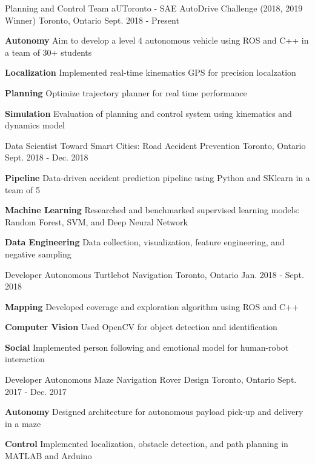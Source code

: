 \begin{cventries}
	\cventry
	{Planning and Control Team}
	{aUToronto - SAE AutoDrive Challenge (2018, 2019 Winner)}
	{Toronto, Ontario}
	{Sept. 2018 - Present}
	{
		\begin{cvitems}
			\item {\textbf{Autonomy} Aim to develop a level 4 autonomous vehicle using ROS and C++ in a team of 30+ students}
			\item {\textbf{Localization} Implemented real-time kinematics GPS for precision localzation
			}
			\item {\textbf{Planning} Optimize trajectory planner for real time performance		
			}
			\item {\textbf{Simulation} Evaluation of planning and control system using kinematics and dynamics model
			}
		\end{cvitems}
	}	
	\cventry
	{Data Scientist}
	{Toward Smart Cities: Road Accident Prevention}
	{Toronto, Ontario}
	{Sept. 2018 - Dec. 2018}
	{
		\begin{cvitems}
			\item {\textbf{Pipeline} Data-driven accident prediction pipeline using Python and SKlearn in a team of 5}
			\item {\textbf{Machine Learning} Researched and benchmarked supervised learning models: Random Forest, SVM, and Deep Neural Network}
			\item {\textbf{Data Engineering} Data collection, visualization, feature engineering, and negative sampling }
		\end{cvitems}
	}
	\cventry
	{Developer}
	{Autonomous Turtlebot Navigation}
	{Toronto, Ontario}
	{Jan. 2018 - Sept. 2018}
	{
		\begin{cvitems}
			\item {\textbf{Mapping} Developed coverage and exploration algorithm using ROS and C++}
			\item {\textbf{Computer Vision} Used OpenCV for object detection and identification}
			\item {\textbf{Social} Implemented person following and emotional model for human-robot interaction}
		\end{cvitems}
	}
	\cventry
	{Developer}
	{Autonomous Maze Navigation Rover Design}
	{Toronto, Ontario}
	{Sept. 2017 - Dec. 2017}
	{
		\begin{cvitems}
			\item { \textbf{Autonomy} Designed architecture for autonomous payload pick-up and delivery in a maze}
			\item { \textbf{Control} Implemented localization, obstacle detection, and path planning in MATLAB and Arduino}
		\end{cvitems}
	}
\end{cventries}

